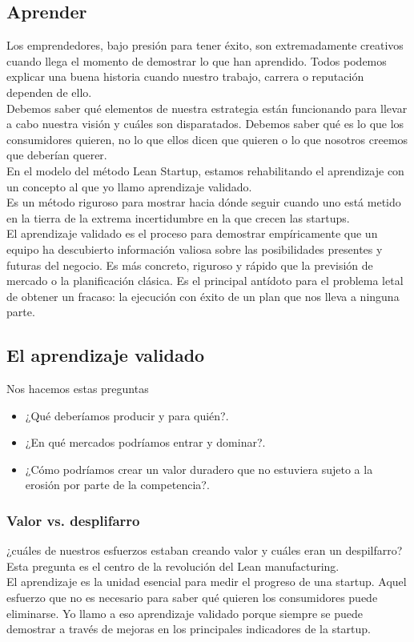 \documentclass[10pt]{article}
\begin{document}
\begin{multicols}{2}
\section*{Aprender}
Los emprendedores, bajo presión para tener éxito, son extremadamente creativos cuando llega el momento de demostrar lo que han aprendido. Todos podemos explicar una buena historia cuando nuestro trabajo, carrera o reputación dependen de ello.\\
Debemos saber qué elementos de nuestra estrategia están funcionando para llevar a cabo nuestra visión y cuáles son disparatados. Debemos saber qué es lo que los consumidores quieren, no lo que ellos dicen que quieren o lo que nosotros creemos que deberían querer.\\
En el modelo del método Lean Startup, estamos rehabilitando el aprendizaje con un concepto al que yo llamo {\color{blue}aprendizaje validado.}\\
Es un método riguroso para mostrar hacia dónde seguir cuando uno está metido en la tierra de la extrema incertidumbre en la que crecen las startups.\\
El aprendizaje validado es el proceso para demostrar empíricamente que un equipo ha descubierto información valiosa sobre las posibilidades presentes y futuras del negocio. Es más concreto, riguroso y rápido que la previsión de mercado o la planificación clásica. Es el principal antídoto para el problema letal de obtener un fracaso: la ejecución con éxito de un plan que nos lleva a ninguna parte.
\subsection*{El aprendizaje validado}
Nos hacemos estas preguntas
\begin{itemize}
\item ¿Qué deberíamos producir y para quién?.
\item ¿En qué mercados podríamos entrar y dominar?.
\item ¿Cómo podríamos crear un valor duradero que no estuviera sujeto a la erosión por parte de la competencia?.
\end{itemize}
\subsubsection*{Valor vs. desplifarro}
¿cuáles de nuestros esfuerzos estaban creando valor y cuáles eran un despilfarro? Esta pregunta es el centro de la revolución del Lean manufacturing.\\
El aprendizaje es la unidad esencial para medir el progreso de una startup. Aquel esfuerzo que no es necesario para saber qué quieren los consumidores puede eliminarse. Yo llamo a eso aprendizaje validado porque siempre se puede demostrar a través de mejoras en los principales indicadores de la startup.

\end{multicols}
\end{document}
